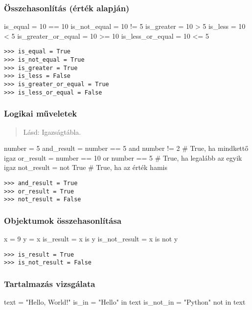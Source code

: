 \subsubsection{Összehasonlítás (érték alapján)}
\begin{pycode}
    is_equal = 10 == 10
    is_not_equal = 10 != 5
    is_greater = 10 > 5
    is_less = 10 < 5
    is_greater_or_equal = 10 >= 10
    is_less_or_equal = 10 <= 5
\end{pycode}
\begin{verbatim}
>>> is_equal = True
>>> is_not_equal = True
>>> is_greater = True
>>> is_less = False
>>> is_greater_or_equal = True
>>> is_less_or_equal = False
\end{verbatim}

\clearpage
\subsubsection{Logikai műveletek}
\begin{quote}
    Lásd: Igazságtábla.
\end{quote}
\begin{pycode}
number = 5
and_result = number == 5 and number != 2  # True, ha mindkettő igaz
or_result = number == 10 or number == 5  # True, ha legalább az egyik igaz
not_result = not True  # True, ha az érték hamis
\end{pycode}
\begin{verbatim}
>>> and_result = True
>>> or_result = True
>>> not_result = False
\end{verbatim}

\subsubsection{Objektumok összehasonlítása}
\begin{pycode}
x = 9
y = x
is_result = x is y
is_not_result = x is not y
\end{pycode}
\begin{verbatim}
>>> is_result = True
>>> is_not_result = False
\end{verbatim}

\subsubsection{Tartalmazás vizsgálata}
\begin{pycode}
    text = "Hello, World!"
    is_in = "Hello" in text
    is_not_in = "Python" not in text
\end{pycode}

